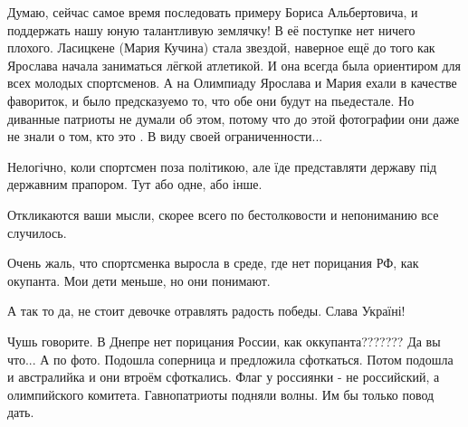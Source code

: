 \begin{itemize}
Думаю, сейчас самое время последовать примеру Бориса Альбертовича, и поддержать
нашу юную талантливую землячку! В её поступке нет ничего плохого. Ласицкене
(Мария Кучина) стала звездой, наверное ещё до того как Ярослава начала
заниматься лёгкой атлетикой. И она всегда была ориентиром для всех молодых
спортсменов. А на Олимпиаду Ярослава и Мария ехали в качестве фавориток, и было
предсказуемо то, что обе они будут на пьедестале. Но диванные патриоты не
думали об этом, потому что до этой фотографии они даже не знали о том, кто это
. В виду своей ограниченности...

 
Нелогічно, коли спортсмен поза політикою, але їде представляти державу під державним прапором. Тут або одне, або інше.

 

Откликаются ваши мысли, скорее всего по бестолковости и непониманию все
случилось.

Очень жаль, что спортсменка выросла в среде, где нет порицания РФ, как
окупанта. Мои дети меньше, но они понимают.

А так то да, не стоит девочке отравлять радость победы. Слава Україні!

\begin{itemize}
 
Чушь говорите. В Днепре нет порицания России, как оккупанта??????? Да вы что...
А по фото. Подошла соперница и предложила сфоткаться. Потом подошла и австралийка и они втроём сфоткались.
Флаг у россиянки - не российский, а олимпийского комитета.
Гавнопатриоты подняли волны. Им бы только повод дать.
\end{itemize}

 

\end{itemize}
